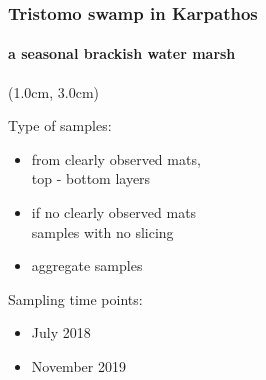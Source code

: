 \documentclass{beamer}
\begin{document}
   \begin{frame}
      \frametitle{Tristomo swamp in Karpathos}
      \framesubtitle{a seasonal brackish water marsh}


      \begin{textblock*}{6cm}(1.0cm, 3.0cm)
         \small 

         Type of samples: 

         \begin{itemize}
            \item from clearly observed mats, \\ top - bottom layers
            \item if no clearly observed mats \\ samples with no slicing 
            \item aggregate samples
         \end{itemize}

         \bigskip

         Sampling time points: \\
         \begin{itemize}
            \item July 2018 
            \item November 2019
         \end{itemize}


      \end{textblock*}

   \end{frame}
\end{document}
